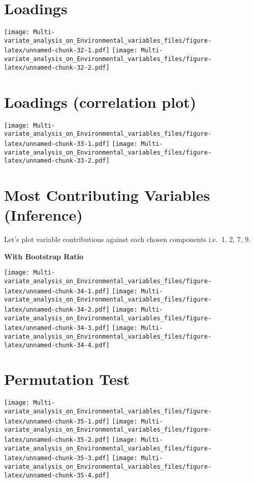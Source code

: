 \documentclass[]{book}
\begin{document}
\hypertarget{loadings-1}{%
\section{Loadings}\label{loadings-1}}

\texttt{[image: Multi-variate\_analysis\_on\_Environmental\_variables\_files/figure-latex/unnamed-chunk-32-1.pdf]}
\texttt{[image: Multi-variate\_analysis\_on\_Environmental\_variables\_files/figure-latex/unnamed-chunk-32-2.pdf]}

\hypertarget{loadings-correlation-plot}{%
\section{Loadings (correlation plot)}\label{loadings-correlation-plot}}

\texttt{[image: Multi-variate\_analysis\_on\_Environmental\_variables\_files/figure-latex/unnamed-chunk-33-1.pdf]}
\texttt{[image: Multi-variate\_analysis\_on\_Environmental\_variables\_files/figure-latex/unnamed-chunk-33-2.pdf]}

\hypertarget{most-contributing-variables-inference}{%
\section{Most Contributing Variables
(Inference)}\label{most-contributing-variables-inference}}

Let's plot variable contributions against each chosen components i.e.~1,
2, 7, 9.

\textbf{With Bootstrap Ratio}

\texttt{[image: Multi-variate\_analysis\_on\_Environmental\_variables\_files/figure-latex/unnamed-chunk-34-1.pdf]}
\texttt{[image: Multi-variate\_analysis\_on\_Environmental\_variables\_files/figure-latex/unnamed-chunk-34-2.pdf]}
\texttt{[image: Multi-variate\_analysis\_on\_Environmental\_variables\_files/figure-latex/unnamed-chunk-34-3.pdf]}
\texttt{[image: Multi-variate\_analysis\_on\_Environmental\_variables\_files/figure-latex/unnamed-chunk-34-4.pdf]}

\hypertarget{permutation-test-1}{%
\section{Permutation Test}\label{permutation-test-1}}

\texttt{[image: Multi-variate\_analysis\_on\_Environmental\_variables\_files/figure-latex/unnamed-chunk-35-1.pdf]}
\texttt{[image: Multi-variate\_analysis\_on\_Environmental\_variables\_files/figure-latex/unnamed-chunk-35-2.pdf]}
\texttt{[image: Multi-variate\_analysis\_on\_Environmental\_variables\_files/figure-latex/unnamed-chunk-35-3.pdf]}
\texttt{[image: Multi-variate\_analysis\_on\_Environmental\_variables\_files/figure-latex/unnamed-chunk-35-4.pdf]}
\end{document}
